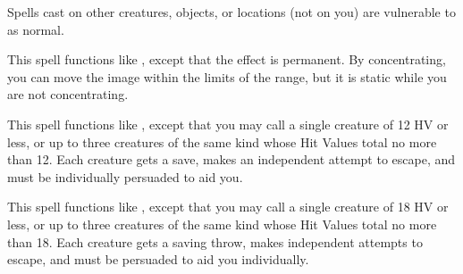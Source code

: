 \begin{spellnotes}
Spells cast on other creatures, objects, or locations (not on you) are vulnerable to  as normal.
\end{spellnotes}

\begin{spelleffect}
This spell functions like , except that the effect is permanent. By concentrating, you can move the image within the limits of the range, but it is static while you are not concentrating.
\end{spelleffect}

\begin{spelleffect}
This spell functions like , except that you may call a single creature of 12 HV or less, or up to three creatures of the same kind whose Hit Values total no more than 12. Each creature gets a save, makes an independent attempt to escape, and must be individually persuaded to aid you.
\end{spelleffect}

\begin{spelleffect}
This spell functions like , except that you may call a single creature of 18 HV or less, or up to three creatures of the same kind whose Hit Values total no more than 18. Each creature gets a saving throw, makes independent attempts to escape, and must be persuaded to aid you individually.
\end{spelleffect}

